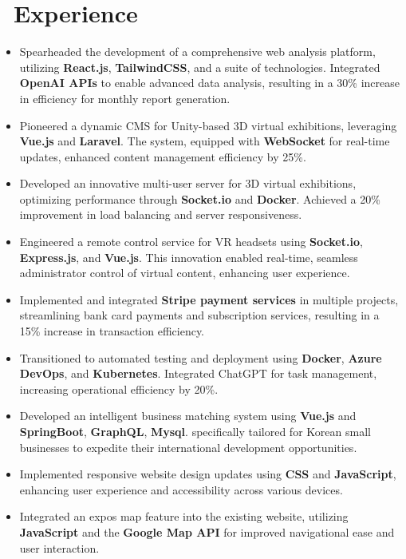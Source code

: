 \documentclass{resume}
\begin{document}
\section{\faUsers\ Experience}
\begin{itemize}[noitemsep]
  \item Spearheaded the development of a comprehensive web analysis platform, utilizing \textbf{React.js}, \textbf{TailwindCSS}, and a suite of technologies. Integrated \textbf{OpenAI APIs} to enable advanced data analysis, resulting in a 30\% increase in efficiency for monthly report generation.
  \item Pioneered a dynamic CMS for Unity-based 3D virtual exhibitions, leveraging \textbf{Vue.js} and \textbf{Laravel}. The system, equipped with \textbf{WebSocket} for real-time updates, enhanced content management efficiency by 25\%.
  \item Developed an innovative multi-user server for 3D virtual exhibitions, optimizing performance through \textbf{Socket.io} and \textbf{Docker}. Achieved a 20\% improvement in load balancing and server responsiveness.
  \item Engineered a remote control service for VR headsets using \textbf{Socket.io}, \textbf{Express.js}, and \textbf{Vue.js}. This innovation enabled real-time, seamless administrator control of virtual content, enhancing user experience.
  \item Implemented and integrated \textbf{Stripe payment services} in multiple projects, streamlining bank card payments and subscription services, resulting in a 15\% increase in transaction efficiency.
  \item Transitioned to automated testing and deployment using \textbf{Docker}, \textbf{Azure DevOps}, and \textbf{Kubernetes}. Integrated ChatGPT for task management, increasing operational efficiency by 20\%.
\end{itemize}

\begin{itemize}
  \item Developed an intelligent business matching system using \textbf{Vue.js} and \textbf{SpringBoot}, \textbf{GraphQL}, \textbf{Mysql}. specifically tailored for Korean small businesses to expedite their international development opportunities.
  \item Implemented responsive website design updates using \textbf{CSS} and \textbf{JavaScript}, enhancing user experience and accessibility across various devices.
  \item Integrated an expos map feature into the existing website, utilizing \textbf{JavaScript} and the \textbf{Google Map API} for improved navigational ease and user interaction.
\end{itemize}
\end{document}
